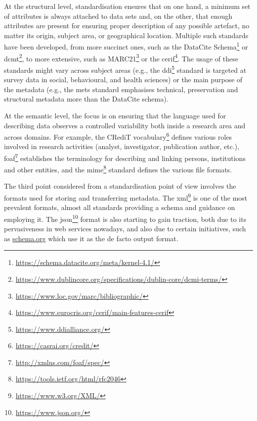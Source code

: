 At the structural level, standardisation ensures that on one hand, a minimum set of attributes is always attached to data sets and, on the other, that enough attributes are present for ensuring proper description of any possible artefact, no matter its origin, subject area, or geographical location. Multiple such standards have been developed, from more succinct ones, such as the DataCite Schema\footnote{\url{https://schema.datacite.org/meta/kernel-4.1/}} or \gls{dcmt}\footnote{\url{https://www.dublincore.org/specifications/dublin-core/dcmi-terms/}}, to more extensive, such as MARC21\footnote{\url{https://www.loc.gov/marc/bibliographic/}} or the \gls{cerif}\footnote{\url{https://www.eurocris.org/cerif/main-features-cerif}}. The usage of these standards might vary across subject areas (e.g., the \gls{ddi}\footnote{\url{https://www.ddialliance.org/}} standard is targeted at survey data in social, behavioural, and health sciences) or the main purpose of the metadata (e.g., the \gls{mets} standard emphasises technical, preservation and structural metadata more than the DataCite schema).

At the semantic level, the focus is on ensuring that the language used for describing data observes a controlled variability both inside a research area and across domains. For example, the CRediT vocabulary\footnote{\url{https://casrai.org/credit/}} defines various roles involved in research activities (analyst, investigator, publication author, etc.), \gls{foaf}\footnote{\url{http://xmlns.com/foaf/spec/}} establishes the terminology for describing and linking persons, institutions and other entities, and the \gls{mime}\footnote{\url{https://tools.ietf.org/html/rfc2046}} standard defines the various file formats.

The third point considered from a standardisation point of view involves the formats used for storing and transferring metadata. The \gls{xml}\footnote{\url{https://www.w3.org/XML/}} is one of the most prevalent formats, almost all standards providing a schema and guidance on employing it. The \gls{json}\footnote{\url{https://www.json.org/}} format is also starting to gain traction, both due to its pervasiveness in web services nowadays, and also due to certain initiatives, such as \url{schema.org} which use it as the de facto output format.

